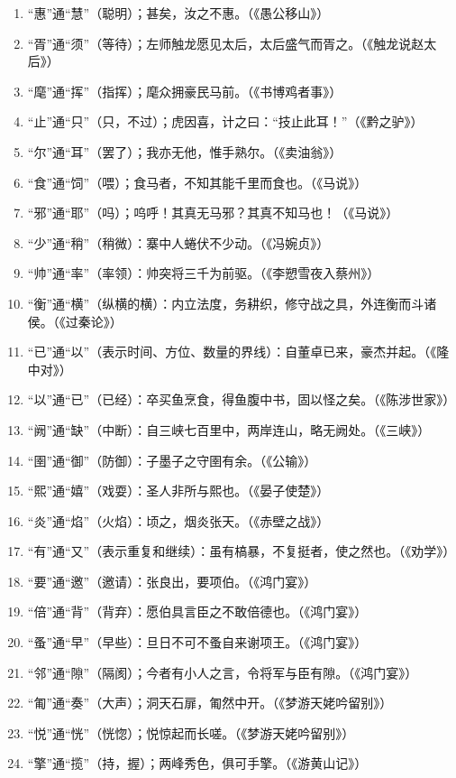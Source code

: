 \begin{enumerate}[label=\textcircled{\arabic*}]
\item “惠”通“慧”（聪明）；甚矣，汝之不惠。（《愚公移山》）
\item “胥”通“须”（等待）；左师触龙愿见太后，太后盛气而胥之。（《触龙说赵太后》）
\item “麾”通“挥”（指挥）；麾众拥豪民马前。（《书博鸡者事》）
\item “止”通“只”（只，不过）；虎因喜，计之曰：“技止此耳！”（《黔之驴》）
\item “尔”通“耳”（罢了）；我亦无他，惟手熟尔。（《卖油翁》）
\item “食”通“饲”（喂）；食马者，不知其能千里而食也。（《马说》）
\item “邪”通“耶”（吗）；呜呼！其真无马邪？其真不知马也！（《马说》）
\item “少”通“稍”（稍微）：寨中人蜷伏不少动。（《冯婉贞》）
\item “帅”通“率”（率领）：帅突将三千为前驱。（《李愬雪夜入蔡州》）
\item “衡”通“横”（纵横的横）：内立法度，务耕织，修守战之具，外连衡而斗诸侯。（《过秦论》）
\item “已”通“以”（表示时间、方位、数量的界线）：自董卓已来，豪杰并起。（《隆中对》）
\item “以”通“已”（已经）：卒买鱼烹食，得鱼腹中书，固以怪之矣。（《陈涉世家》）
\item “阙”通“缺”（中断）：自三峡七百里中，两岸连山，略无阙处。（《三峡》）
\item “圉”通“御”（防御）：子墨子之守圉有余。（《公输》）
\item “熙”通“嬉”（戏耍）：圣人非所与熙也。（《晏子使楚》）
\item “炎”通“焰”（火焰）：顷之，烟炎张天。（《赤壁之战》）
\item “有”通“又”（表示重复和继续）：虽有槁暴，不复挺者，使之然也。（《劝学》）
\item “要”通“邀”（邀请）：张良出，要项伯。（《鸿门宴》）
\item “倍”通“背”（背弃）：愿伯具言臣之不敢倍德也。（《鸿门宴》）
\item “蚤”通“早”（早些）：旦日不可不蚤自来谢项王。（《鸿门宴》）
\item “邻”通“隙”（隔阂）；今者有小人之言，令将军与臣有隙。（《鸿门宴》）
\item “匍”通“奏”（大声）；洞天石扉，匍然中开。（《梦游天姥吟留别》）
\item “悦”通“恍”（恍惚）；悦惊起而长嗟。（《梦游天姥吟留别》）
\item “擎”通“揽”（持，握）；两峰秀色，俱可手擎。（《游黄山记》）

\end{enumerate}
